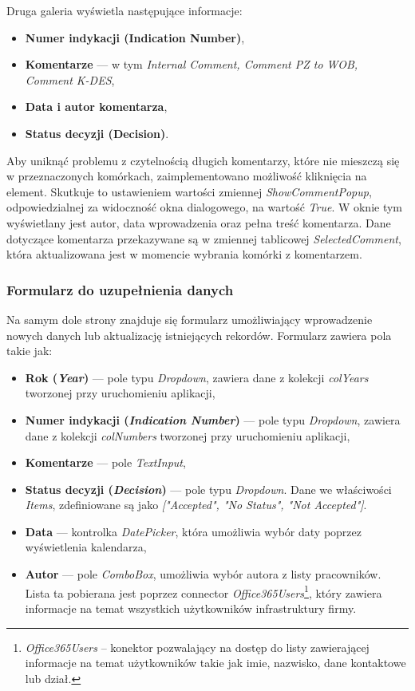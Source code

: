 Druga galeria wyświetla następujące informacje:
\begin{itemize}
\item \textbf{Numer indykacji (Indication Number)},
\item \textbf{Komentarze} — w tym \emph{Internal Comment, Comment PZ to WOB, Comment K-DES},
\item \textbf{Data i autor komentarza},
\item \textbf{Status decyzji (Decision)}.
\end{itemize}

Aby uniknąć problemu z czytelnością długich komentarzy, które nie mieszczą się w przeznaczonych komórkach, zaimplementowano możliwość kliknięcia na element. Skutkuje to ustawieniem wartości zmiennej \emph{ShowCommentPopup}, odpowiedzialnej za widoczność okna dialogowego, na wartość \emph{True}. W oknie tym wyświetlany jest autor, data wprowadzenia oraz pełna treść komentarza. Dane dotyczące komentarza przekazywane są w zmiennej tablicowej \emph{SelectedComment}, która aktualizowana jest w momencie wybrania komórki z komentarzem.

\subsubsection*{Formularz do uzupełnienia danych}

Na samym dole strony znajduje się formularz umożliwiający wprowadzenie nowych danych lub aktualizację istniejących rekordów. Formularz zawiera pola takie jak:
\begin{itemize}
    \item \textbf{Rok (\emph{Year})} — pole typu \emph{Dropdown}, zawiera dane z kolekcji \emph{colYears} tworzonej przy uruchomieniu aplikacji,
    \item \textbf{Numer indykacji (\emph{Indication Number})} — pole typu \emph{Dropdown}, zawiera dane z kolekcji \emph{colNumbers} tworzonej przy uruchomieniu aplikacji,
    \item \textbf{Komentarze} — pole \emph{TextInput},
    \item \textbf{Status decyzji (\emph{Decision})} — pole typu \emph{Dropdown}. Dane we właściwości \emph{Items}, zdefiniowane są jako \emph{["Accepted", "No Status", "Not Accepted"]}.
    \item \textbf{Data} — kontrolka \emph{DatePicker}, która umożliwia wybór daty poprzez wyświetlenia kalendarza,
    \item \textbf{Autor} — pole \emph{ComboBox}, umożliwia wybór autora z listy pracowników. Lista ta pobierana jest poprzez connector \emph{Office365Users}\footnote{\emph{Office365Users} -- konektor pozwalający na dostęp do listy zawierającej informacje na temat użytkowników takie jak imie, nazwisko, dane kontaktowe lub dział.}, który zawiera informacje na temat wszystkich użytkowników infrastruktury firmy.
\end{itemize}


